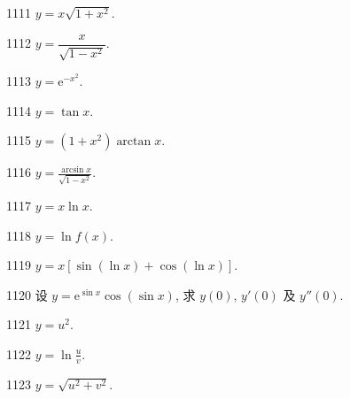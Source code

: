 

\begin{prob}[S]{1111}
$y = x\sqrt{1 + x^2}$.
\end{prob}

\begin{prob}[S]{1112}
$y = \dfrac{x}{\sqrt{1 - x^2}}$.
\end{prob}

\begin{prob}[S]{1113}
$y = \mathrm{e}^{-x^2}$.
\end{prob}

\begin{prob}[S]{1114}
$y = \tan x$.
\end{prob}

\begin{prob}[S]{1115}
$y = (1 + x^2)\arctan x$.
\end{prob}

\begin{prob}[S]{1116}
$y = \frac{\arcsin x}{\sqrt{1 - x^2}}$.
\end{prob}

\begin{prob}[S]{1117}
$y = x\ln x$.
\end{prob}

\begin{prob}[S]{1118}
$y = \ln f(x)$.
\end{prob}

\begin{prob}[S]{1119}
$y = x[\sin(\ln x) + \cos(\ln x)]$.
\end{prob}

\begin{prob}[M]{1120}
设 $y = \mathrm{e}^{\sin x}\cos(\sin x)$, 求 $y(0)$, $y'(0)$ 及 $y''(0)$.
\end{prob}


\begin{prob}[S]{1121}
$y = u^2$.
\end{prob}

\begin{prob}[S]{1122}
$y = \ln\frac{u}{v}$.
\end{prob}

\begin{prob}[S]{1123}
$y = \sqrt{u^2 + v^2}$.
\end{prob}


